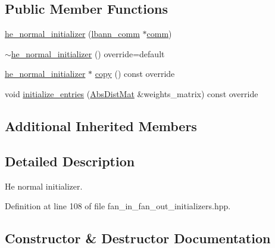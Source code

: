 \subsection*{Public Member Functions}
\begin{DoxyCompactItemize}
\item 
\hyperlink{classlbann_1_1he__normal__initializer_a959fc0dcf16250291142a3fc308cfc03}{he\+\_\+normal\+\_\+initializer} (\hyperlink{classlbann_1_1lbann__comm}{lbann\+\_\+comm} $\ast$\hyperlink{file__io_8cpp_ab048c6f9fcbcfaa57ce68b00263dbebe}{comm})
\item 
\hyperlink{classlbann_1_1he__normal__initializer_ad883d984ad8dfd44c8ed8d28f5a9697d}{$\sim$he\+\_\+normal\+\_\+initializer} () override=default
\item 
\hyperlink{classlbann_1_1he__normal__initializer}{he\+\_\+normal\+\_\+initializer} $\ast$ \hyperlink{classlbann_1_1he__normal__initializer_af71916bbf87c6d34fb701c79fa6237bf}{copy} () const override
\item 
void \hyperlink{classlbann_1_1he__normal__initializer_a01d283880fc0c1b743bcc89e732f4e15}{initialize\+\_\+entries} (\hyperlink{base_8hpp_a9a697a504ae84010e7439ffec862b470}{Abs\+Dist\+Mat} \&weights\+\_\+matrix) const override
\end{DoxyCompactItemize}
\subsection*{Additional Inherited Members}


\subsection{Detailed Description}
He normal initializer. 

Definition at line 108 of file fan\+\_\+in\+\_\+fan\+\_\+out\+\_\+initializers.\+hpp.



\subsection{Constructor \& Destructor Documentation}
\mbox{\label{classlbann_1_1he__normal__initializer_a959fc0dcf16250291142a3fc308cfc03}} 
